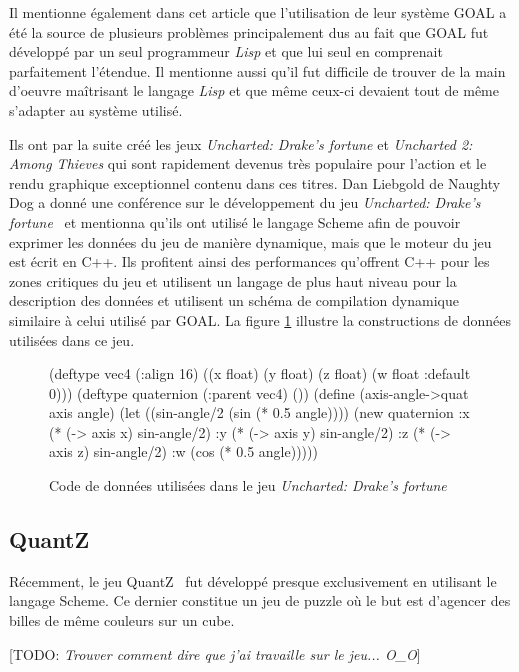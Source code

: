 \documentclass[12pt,oneside,letterpaper,francais]{book}
\newcommand{\todo}[1]{[TODO: {\it #1}]}
\newcommand{\lisp}{{\textit{Lisp }}}
\begin{document}
Il mentionne également dans cet article que l'utilisation de leur
système GOAL a été la source de plusieurs problèmes principalement dus
au fait que GOAL fut développé par un seul programmeur \lisp et que lui
seul en comprenait parfaitement l'étendue. Il mentionne aussi qu'il
fut difficile de trouver de la main d'oeuvre maîtrisant le langage
\lisp et que même ceux-ci devaient tout de même s'adapter au système
utilisé.

Ils ont par la suite créé les jeux \textit{Uncharted: Drake's fortune}
et \textit{Uncharted 2: Among Thieves} qui sont rapidement devenus
très populaire pour l'action et le rendu graphique exceptionnel
contenu dans ces titres. Dan Liebgold de Naughty Dog a donné une
conférence sur le développement du jeu \textit{Uncharted: Drake's
  fortune}~\cite{ND_DRAKE} et mentionna qu'ils ont utilisé le langage
Scheme afin de pouvoir exprimer les données du jeu de manière
dynamique, mais que le moteur du jeu est écrit en C++. Ils profitent
ainsi des performances qu'offrent C++ pour les zones critiques du jeu
et utilisent un langage de plus haut niveau pour la description des
données et utilisent un schéma de compilation dynamique similaire à
celui utilisé par GOAL. La figure \ref{Rev:Drake} illustre la
constructions de données utilisées dans ce jeu.

\begin{figure}[htb!]
  \begin{schemecode}
(deftype vec4 (:align 16)
  ((x float) (y float)
   (z float) (w float :default 0)))
(deftype quaternion (:parent vec4) ())
(define (axis-angle->quat axis angle)
 (let ((sin-angle/2 (sin (* 0.5 angle))))
  (new quaternion
       :x (* (-> axis x) sin-angle/2)
       :y (* (-> axis y) sin-angle/2)
       :z (* (-> axis z) sin-angle/2)
       :w (cos (* 0.5 angle)))))
  \end{schemecode}
  \caption{Code de données utilisées dans le jeu \textit{Uncharted:
      Drake's fortune}~\cite{ND_DRAKE}}
  \label{Rev:Drake}
\end{figure}


\subsection{QuantZ}
Récemment, le jeu QuantZ~\cite{Quantz} fut développé presque
exclusivement en utilisant le langage Scheme. Ce dernier constitue un
jeu de puzzle où le but est d'agencer des billes de même couleurs sur
un cube. 

\todo{Trouver comment dire que j'ai travaille sur le jeu... O\_O}
\end{document}
